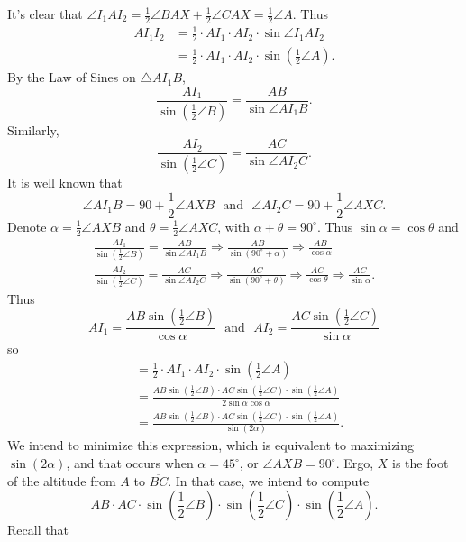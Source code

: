 \begin{enumerate}
It's clear that $\angle I_{1}AI_{2}=\frac{1}{2}\angle BAX+\frac{1}{2}\angle CAX=\frac{1}{2}\angle A$. Thus 
 \begin{align*} AI_{1}I_{2}&=\frac{1}{2}\cdot AI_{1}\cdot AI_{2}\cdot\sin\angle I_{1}AI_{2} \\ &=\frac{1}{2}\cdot AI_{1}\cdot AI_{2}\cdot\sin\left(\frac{1}{2}\angle A\right).\end{align*}
 By the Law of Sines on $\triangle AI_{1}B$, 
 \[\frac{AI_{1}}{\sin\left(\frac{1}{2}\angle B\right)}=\frac{AB}{\sin\angle AI_{1}B}.\] Similarly, 
 \[\frac{AI_{2}}{\sin\left(\frac{1}{2}\angle C\right)}=\frac{AC}{\sin\angle AI_{2}C}.\] It is well known that 
 \[\angle AI_{1}B=90+\frac{1}{2}\angle AXB~~~\text{and}~~~\angle AI_{2}C=90+\frac{1}{2}\angle AXC.\] Denote $\alpha=\frac{1}{2}\angle AXB$ and $\theta=\frac{1}{2}\angle AXC$, with $\alpha+\theta=90^{\circ}$. Thus $\sin\alpha=\cos\theta$ and 
 \begin{align*}\frac{AI_{1}}{\sin\left(\frac{1}{2}\angle B\right)}=\frac{AB}{\sin\angle AI_{1}B}\Longrightarrow\frac{AB}{\sin\left(90^{\circ}+\alpha\right)}\Longrightarrow\frac{AB}{\cos\alpha} \\\frac{AI_{2}}{\sin\left(\frac{1}{2}\angle C\right)}=\frac{AC}{\sin\angle AI_{2}C}\Longrightarrow\frac{AC}{\sin\left(90^{\circ}+\theta\right)}\Longrightarrow\frac{AC}{\cos\theta}\Longrightarrow\frac{AC}{\sin\alpha}.\end{align*}
 Thus 
 \[AI_{1}=\frac{AB\sin\left(\frac{1}{2}\angle B\right)}{\cos\alpha}~~~\text{and}~~~AI_{2}=\frac{AC\sin\left(\frac{1}{2}\angle C\right)}{\sin\alpha}\] so 
 \begin{align*}[AI_{1}I_{2}]&=\frac{1}{2}\cdot AI_{1}\cdot AI_{2}\cdot\sin\left(\frac{1}{2}\angle A\right) \\ &=\frac{AB\sin\left(\frac{1}{2}\angle B\right)\cdot AC\sin\left(\frac{1}{2}\angle C\right)\cdot\sin\left(\frac{1}{2}\angle A\right)}{2\sin\alpha\cos\alpha} \\ &=\frac{AB\sin\left(\frac{1}{2}\angle B\right)\cdot AC\sin\left(\frac{1}{2}\angle C\right)\cdot\sin\left(\frac{1}{2}\angle A\right)}{\sin(2\alpha)}.\end{align*}
 We intend to minimize this expression, which is equivalent to maximizing $\sin(2\alpha)$, and that occurs when $\alpha=45^{\circ}$, or $\angle AXB=90^{\circ}$. Ergo, $X$ is the foot of the altitude from $A$ to $\overline{BC}$. In that case, we intend to compute 
 \[AB\cdot AC\cdot\sin\left(\frac{1}{2}\angle B\right)\cdot\sin\left(\frac{1}{2}\angle C\right)\cdot\sin\left(\frac{1}{2}\angle A\right).\] Recall that 

\end{enumerate}
